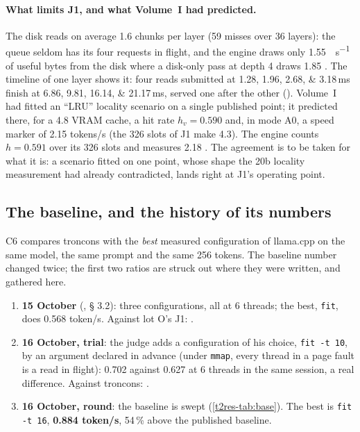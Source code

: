 \paragraph{What limits J1, and what Volume~I had predicted.} The disk reads on average \num{1.6} chunks per layer (59 misses over 36 layers): the queue seldom has its four requests in flight, and the engine draws only \SI{1.55}{\Go\per\second} of useful bytes from the disk where a disk-only pass at depth 4 draws \num{1.85} \mes. The timeline of one layer shows it: four reads submitted at \numlist{1.28;1.96;2.68;3.18}\,ms finish at \numlist{6.86;9.81;16.14;21.17}\,ms, served one after the other (). Volume~I had fitted an ``LRU'' locality scenario on a single published point; it predicted there, for a \SI{4.8}{\Go} VRAM cache, a hit rate $h_v = 0.590$ and, in mode A0, a speed marker of \num{2.15} tokens/s (the 326 slots of J1 make \SI{4.3}{\Go}). The engine counts $h = 0.591$ over its 326 slots and measures \num{2.18} \mes. The agreement is to be taken for what it is: a scenario fitted on one point, whose shape the 20b locality measurement had already contradicted, lands right at J1's operating point.

\subsection{The baseline, and the history of its numbers}\label{t2res-sec:base}

C6 compares troncons with the \emph{best} measured configuration of llama.cpp on the same model, the same prompt and the same 256 tokens. The baseline number changed twice; the first two ratios are struck out where they were written, and gathered here.

\begin{enumerate}
\item \textbf{15 October} (, § 3.2): three configurations, all at 6 threads; the best, \texttt{fit}, does \num{0.568} token/s. Against lot O's J1: .
\item \textbf{16 October, trial}: the judge adds a configuration of his choice, \texttt{fit -t 10}, by an argument declared in advance (under \texttt{mmap}, every thread in a page fault is a read in flight): \num{0.702} against \num{0.627} at 6 threads in the same session, a real difference. Against troncons: .
\item \textbf{16 October, round}: the baseline is swept (\cref{t2res-tab:base}). The best is \texttt{fit -t 16}, \textbf{\num{0.884} token/s}, \num{54}\,\% above the published baseline.
\end{enumerate}

